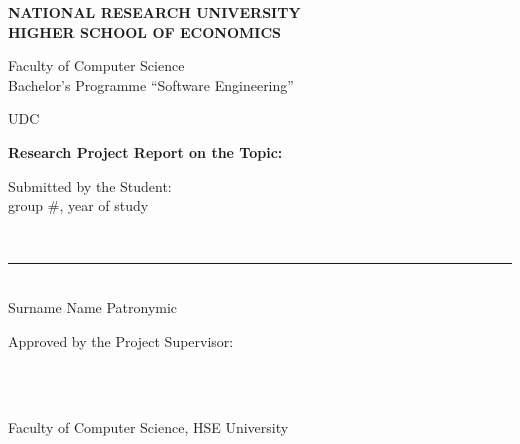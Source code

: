 \begin{titlepage}
\thispagestyle{empty}
\singlespacing
\footnotesize
\setlength{\parindent}{0pt}
\setlength{\parskip}{0pt}


\begin{center}
\textbf{NATIONAL RESEARCH UNIVERSITY}\\
\textbf{HIGHER SCHOOL OF ECONOMICS}

\vspace{0.35cm}
Faculty of Computer Science\\
Bachelor's Programme ``Software Engineering''
\end{center}

\vspace{0.3cm}
\noindent
UDC~\hseUDC

\vspace{1.2cm}
\begin{center}
\textbf{\normalsize Research Project Report on the Topic:}

\vspace{0.45cm}
\underline{\makebox[0.9\textwidth][c]{\hseProjectName}}
\end{center}

\vspace{1.4cm}
\noindent
\begin{minipage}[t]{0.5\textwidth}
\raggedright
Submitted by the Student:\\
group \#\hseGroup, \hseCourse{} year of study

\vspace{0.35cm}
\strut\hseAuthorName\\[-0.05cm]
\rule{6cm}{0.4pt}\\[-0.05cm]
{\scriptsize Surname Name Patronymic}
\end{minipage}

\vspace{0.9cm}
\noindent
\begin{minipage}[t]{0.7\textwidth}
\raggedright
Approved by the Project Supervisor:\\
\strut\hseSupervisorName\\
\strut\hseSupervisorTitle\\
Faculty of Computer Science, HSE University
\end{minipage}

\vfill
\begin{center}
\textbf{\hseCityEn{} \hseYear}
\end{center}

\end{titlepage}

\setcounter{page}{2}
\clearpage
